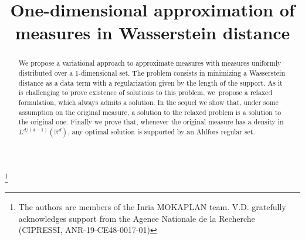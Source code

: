 \documentclass[JEP,XML,SOM,Unicode,NoFloatCountersInSection,published]{cedram}
\theoremstyle{definition}
\begin{document}
\title{One-dimensional approximation of measures in Wasserstein distance}

\author[\initial{A.} \lastname{Chambolle}]{ }
\address{CEREMADE, CNRS, Université Paris-Dauphine, PSL,\\ 75775 Paris, France\\
\& Inria}

\author[\initial{V.} \lastname{Duval}]{ }
\address{CEREMADE, CNRS, Université Paris-Dauphine, PSL,\\ 75775 Paris, France\\
\& Inria}

\author[\initial{J. M.} \lastname{Machado}]{\nobreakauthor {}}
\address{CEREMADE, CNRS, Université Paris-Dauphine, PSL,\\ 75775 Paris, France\\
\& Inria}
\urladdr{}

\thanks{The authors are members of the Inria MOKAPLAN team. V.D. gratefully acknowledges support from the Agence Nationale de la Recherche (CIPRESSI, ANR-19-CE48-0017-01)}

\begin{abstract}
We propose a variational approach to approximate measures with measures uniformly distributed over a 1-dimensional set. The problem consists in minimizing a Wasserstein distance as a data term with a regularization given by the length of the support. As it is challenging to prove existence of solutions to this problem, we~propose a relaxed formulation, which always admits a solution. In the sequel we show that, under some assumption on the original measure, a solution to the relaxed problem is a solution to the original one. Finally we prove that, whenever the original measure has a density in $L^{d/(d-1)}(\mathbb{R}^d)$, any optimal solution is supported by an Ahlfors regular set.
\end{abstract}



\end{document}

